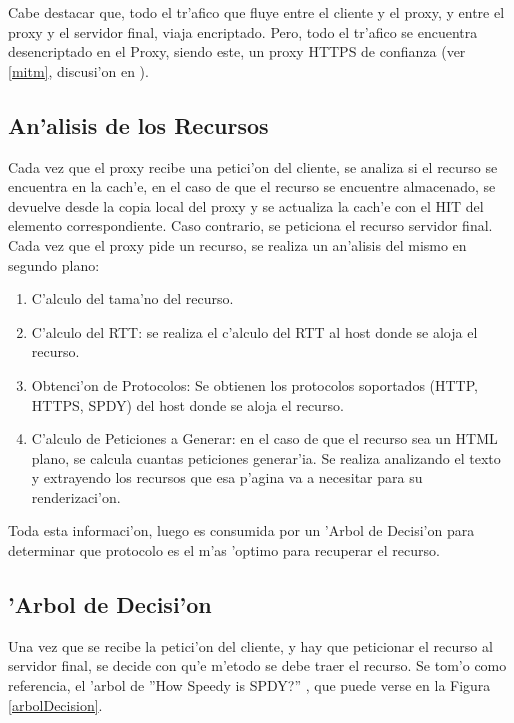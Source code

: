Cabe destacar que, todo el tr'afico que fluye entre el cliente y el proxy, y entre el proxy y el servidor final, viaja encriptado. Pero, todo el tr'afico se encuentra desencriptado en el Proxy, siendo este, un proxy HTTPS de confianza (ver \ref{mitm}, discusi'on en \citep{draftTrustedProxy}).

\subsection{An'alisis de los Recursos}
\label{analisisRecurso}
Cada vez que el proxy recibe una petici'on del cliente, se analiza si el recurso se encuentra en la cach'e, en el caso de que el recurso se encuentre almacenado, se devuelve desde la copia local del proxy y se actualiza la cach'e con el HIT del elemento correspondiente. Caso contrario, se peticiona el recurso servidor final.
Cada vez que el proxy pide un recurso, se realiza un an'alisis del mismo en segundo plano:
\begin{enumerate}
\item C'alculo del tama'no del recurso.
\item C'alculo del RTT: se realiza el c'alculo del RTT al host donde se aloja el recurso.
\item Obtenci'on de Protocolos: Se obtienen los protocolos soportados (HTTP, HTTPS, SPDY) del host donde se aloja el recurso.
\item C'alculo de Peticiones a Generar: en el caso de que el recurso sea un HTML plano, se calcula cuantas peticiones generar'ia. Se realiza analizando el texto y extrayendo los recursos que esa p'agina va a necesitar para su renderizaci'on.
\end{enumerate}
Toda esta informaci'on, luego es consumida por un 'Arbol de Decisi'on para determinar que protocolo es el m'as 'optimo para recuperar el recurso.

\subsection{'Arbol de Decisi'on}

Una vez que se recibe la petici'on del cliente, y hay que peticionar el recurso al servidor final, se decide con qu'e m'etodo se debe traer el recurso. Se tom'o como referencia, el 'arbol de ''How Speedy is SPDY?'' \citep{howSpeedy}, que puede verse en la Figura \ref{arbolDecision}.

